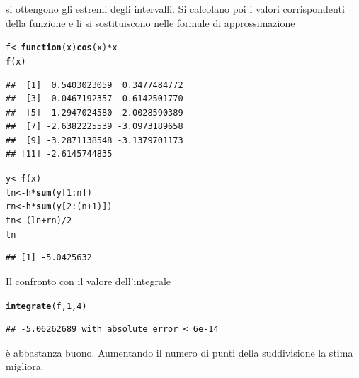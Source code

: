\documentclass[onecolumn,11pt]{book}\usepackage[]{graphicx}\usepackage[]{color}
\makeatletter
\newcommand{\hlnum}[1]{\textcolor[rgb]{0.686,0.059,0.569}{#1}}%
\newcommand{\hlopt}[1]{\textcolor[rgb]{0,0,0}{#1}}%
\newcommand{\hlstd}[1]{\textcolor[rgb]{0.345,0.345,0.345}{#1}}%
\newcommand{\hlkwa}[1]{\textcolor[rgb]{0.161,0.373,0.58}{\textbf{#1}}}%
\newcommand{\hlkwb}[1]{\textcolor[rgb]{0.69,0.353,0.396}{#1}}%
\newcommand{\hlkwc}[1]{\textcolor[rgb]{0.333,0.667,0.333}{#1}}%
\newcommand{\hlkwd}[1]{\textcolor[rgb]{0.737,0.353,0.396}{\textbf{#1}}}%
\newenvironment{kframe}{%
 \def\at@end@of@kframe{}%
 \ifinner\ifhmode%
  \def\at@end@of@kframe{\end{minipage}}%
  \begin{minipage}{\columnwidth}%
 \fi\fi%
 \def\FrameCommand##1{\hskip\@totalleftmargin \hskip-\fboxsep
 \colorbox{shadecolor}{##1}\hskip-\fboxsep
     \hskip-\linewidth \hskip-\@totalleftmargin \hskip\columnwidth}%
 \MakeFramed {\advance\hsize-\width
   \@totalleftmargin\z@ \linewidth\hsize
   \@setminipage}}%
 {\par\unskip\endMakeFramed%
 \at@end@of@kframe}
\newenvironment{knitrout}{}{} %
\makeatother
\begin{document}
si ottengono gli estremi degli intervalli. Si calcolano poi i valori corrispondenti della funzione e li si sostituiscono nelle formule di approssimazione
\begin{knitrout}
\color{fgcolor}\begin{kframe}
\begin{alltt}
\hlstd{f}\hlkwb{<-}\hlkwa{function}\hlstd{(}\hlkwc{x}\hlstd{)} \hlkwd{cos}\hlstd{(x)}\hlopt{*}\hlstd{x}
\hlkwd{f}\hlstd{(x)}
\end{alltt}
\begin{verbatim}
##  [1]  0.5403023059  0.3477484772
##  [3] -0.0467192357 -0.6142501770
##  [5] -1.2947024580 -2.0028590389
##  [7] -2.6382225539 -3.0973189658
##  [9] -3.2871138548 -3.1379701173
## [11] -2.6145744835
\end{verbatim}
\begin{alltt}
\hlstd{y}\hlkwb{<-}\hlkwd{f}\hlstd{(x)}
\hlstd{ln}\hlkwb{<-}\hlstd{h}\hlopt{*}\hlkwd{sum}\hlstd{(y[}\hlnum{1}\hlopt{:}\hlstd{n] )}
\hlstd{rn}\hlkwb{<-}\hlstd{h}\hlopt{*}\hlkwd{sum}\hlstd{(y[}\hlnum{2}\hlopt{:}\hlstd{(n}\hlopt{+}\hlnum{1}\hlstd{)])}
\hlstd{tn}\hlkwb{<-}\hlstd{(ln}\hlopt{+}\hlstd{rn)}\hlopt{/}\hlnum{2}
\hlstd{tn}
\end{alltt}
\begin{verbatim}
## [1] -5.0425632
\end{verbatim}
\end{kframe}
\end{knitrout}
Il confronto con il valore dell'integrale
\begin{knitrout}
\color{fgcolor}\begin{kframe}
\begin{alltt}
\hlkwd{integrate}\hlstd{(f,}\hlnum{1}\hlstd{,}\hlnum{4}\hlstd{)}
\end{alltt}
\begin{verbatim}
## -5.06262689 with absolute error < 6e-14
\end{verbatim}
\end{kframe}
\end{knitrout}
\`e abbastanza buono. Aumentando il numero di punti della suddivisione la stima migliora.
\end{document}
